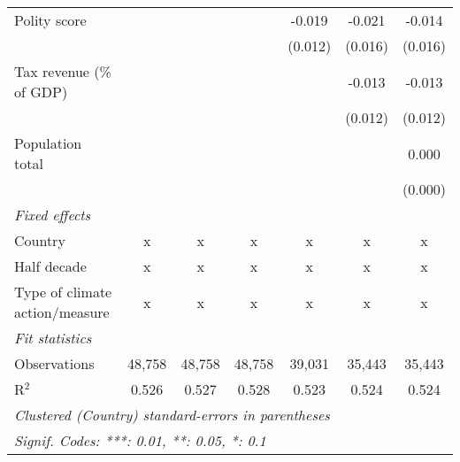 \begin{tabular}{lcccccc}
   Polity score                                                  &               &               &                & -0.019         & -0.021         & -0.014\\   
                                                                 &               &               &                & (0.012)        & (0.016)        & (0.016)\\   
   Tax revenue (\% of GDP)                                       &               &               &                &                & -0.013         & -0.013\\   
                                                                 &               &               &                &                & (0.012)        & (0.012)\\   
   Population total                                              &               &               &                &                &                & 0.000\\   
                                                                 &               &               &                &                &                & (0.000)\\   
   \emph{Fixed effects}\\
   Country                                                       & x             & x             & x              & x              & x              & x\\  
   Half decade                                                   & x             & x             & x              & x              & x              & x\\  
   Type of climate action/measure                                & x             & x             & x              & x              & x              & x\\  
   \midrule \emph{Fit statistics}\\
   Observations                                                  & 48,758        & 48,758        & 48,758         & 39,031         & 35,443         & 35,443\\  
   R$^2$                                                         & 0.526         & 0.527         & 0.528          & 0.523          & 0.524          & 0.524\\  
   \midrule
   \multicolumn{7}{l}{\emph{Clustered (Country) standard-errors in parentheses}}\\
   \multicolumn{7}{l}{\emph{Signif. Codes: ***: 0.01, **: 0.05, *: 0.1}}\\
\end{tabular}
\par\endgroup


